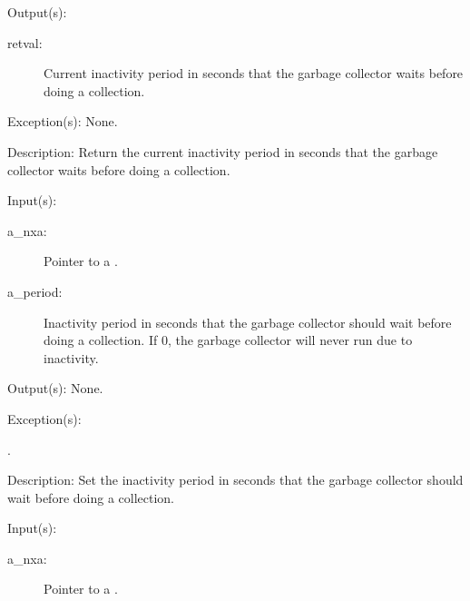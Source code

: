 \begin{capi}
\begin{capilist}
\begin{description}
		\end{description}
	\item[Output(s): ]
		\begin{description}\item[]
		\item[retval: ]
			Current inactivity period in seconds that the garbage
			collector waits before doing a collection.
		\end{description}
	\item[Exception(s): ] None.
	\item[Description: ]
		Return the current inactivity period in seconds that the garbage
		collector waits before doing a collection.
	\end{capilist}
\label{nxa_period_set}
	\begin{capilist}
	\item[Input(s): ]
		\begin{description}\item[]
		\item[a\_nxa: ]
			Pointer to a .
		\item[a\_period: ]
			Inactivity period in seconds that the garbage collector
			should wait before doing a collection.  If 0, the
			garbage collector will never run due to inactivity.
		\end{description}
	\item[Output(s): ] None.
	\item[Exception(s): ]
		\begin{description}\item[]
		\item[.]
		\end{description}
	\item[Description: ]
		Set the inactivity period in seconds that the garbage collector
		should wait before doing a collection.
	\end{capilist}
\label{nxa_threshold_get}
	\begin{capilist}
	\item[Input(s): ]
		\begin{description}\item[]
		\item[a\_nxa: ]
			Pointer to a \classname{nxa}.
		\end{description}

\end{capilist}
\end{capi}
